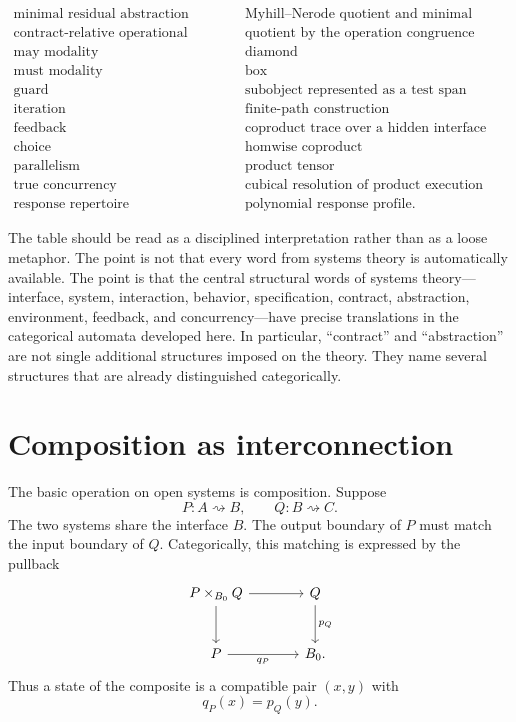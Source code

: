 \[\begin{array}{c|c}
\\
\text{minimal residual abstraction}
&
\text{Myhill--Nerode quotient and minimal realization}
\\
\text{contract-relative operational abstraction}
&
\text{quotient by the operation congruence}
\\
\text{may modality}
&
\text{diamond}
\\
\text{must modality}
&
\text{box}
\\
\text{guard}
&
\text{subobject represented as a test span}
\\
\text{iteration}
&
\text{finite-path construction}
\\
\text{feedback}
&
\text{coproduct trace over a hidden interface}
\\
\text{choice}
&
\text{homwise coproduct}
\\
\text{parallelism}
&
\text{product tensor}
\\
\text{true concurrency}
&
\text{cubical resolution of product execution}
\\
\text{response repertoire}
&
\text{polynomial response profile}.
\end{array}
\]

The table should be read as a disciplined interpretation rather than as a
loose metaphor.  The point is not that every word from systems theory is
automatically available.  The point is that the central structural words of
systems theory---interface, system, interaction, behavior, specification,
contract, abstraction, environment, feedback, and concurrency---have precise
translations in the categorical automata developed here.  In particular,
``contract'' and ``abstraction'' are not single additional structures imposed
on the theory.  They name several structures that are already distinguished
categorically.

\section{Composition as interconnection}
\label{sec:composition-as-interconnection}

The basic operation on open systems is composition.  Suppose
\[
  P:A\rightsquigarrow B,
  \qquad
  Q:B\rightsquigarrow C.
\]
The two systems share the interface \(B\).  The output boundary of \(P\) must
match the input boundary of \(Q\).  Categorically, this matching is expressed
by the pullback
\[
\begin{tikzcd}[column sep=large,row sep=large]
  P\times_{B_0}Q
    \ar[r]
    \ar[d]
  &
  Q
    \ar[d,"p_Q"]
  \\
  P
    \ar[r,"q_P"']
  &
  B_0 .
\end{tikzcd}
\]
Thus a state of the composite is a compatible pair \((x,y)\) with
\[
  q_P(x)=p_Q(y).
\]

